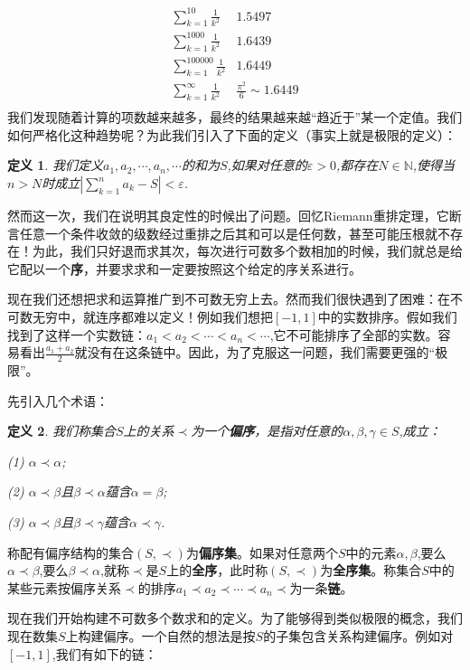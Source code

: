 \documentclass{article}
\newtheorem{definition}{定义}[subsection]
\begin{document}
$$
\begin{matrix}
	\sum_{k=1}^{10}{\frac{1}{k^2}}&		1.5497\\
	\sum_{k=1}^{1000}{\frac{1}{k^2}}&		1.6439\\
	\sum_{k=1}^{100000}{\frac{1}{k^2}}&		1.6449\\
	\sum_{k=1}^{\infty}{\frac{1}{k^2}}&		\frac{\pi ^2}{6}\sim 1.6449\\
\end{matrix}
$$
我们发现随着计算的项数越来越多，最终的结果越来越“趋近于”某一个定值。我们如何严格化这种趋势呢？为此我们引入了下面的定义（事实上就是极限的定义）：
\begin{definition}
我们定义$a_1,a_2,\cdots,a_n,\cdots$的和为$S$,如果对任意的$\varepsilon>0$,都存在$N\in\mathbb{N}$,使得当$n>N$时成立$\left|\sum_{k=1}^na_k-S\right|<\varepsilon$.
\end{definition}
然而这一次，我们在说明其良定性的时候出了问题。回忆Riemann重排定理，它断言任意一个条件收敛的级数经过重排之后其和可以是任何数，甚至可能压根就不存在！为此，我们只好退而求其次，每次进行可数多个数相加的时候，我们就总是给它配以一个\textbf{序}，并要求求和一定要按照这个给定的序关系进行。\par
现在我们还想把求和运算推广到不可数无穷上去。然而我们很快遇到了困难：在不可数无穷中，就连序都难以定义！例如我们想把$[-1,1]$中的实数排序。假如我们找到了这样一个实数链：$a_1<a_2<\cdots<a_n<\cdots$,它不可能排序了全部的实数。容易看出$\frac{a_1+a_2}{2}$就没有在这条链中。因此，为了克服这一问题，我们需要更强的“极限”。\par
先引入几个术语：
\begin{definition}
我们称集合$S$上的关系$\prec$为一个\textbf{偏序}，是指对任意的$\alpha,\beta,\gamma\in S$,成立：\par
(1) $\alpha\prec\alpha$;\par
(2) $\alpha\prec\beta$且$\beta\prec\alpha$蕴含$\alpha=\beta$;\par
(3) $\alpha\prec\beta$且$\beta\prec\gamma$蕴含$\alpha\prec\gamma$.
\end{definition}
称配有偏序结构的集合$(S,\prec)$为\textbf{偏序集}。如果对任意两个$S$中的元素$\alpha,\beta$,要么$\alpha\prec\beta$,要么$\beta\prec\alpha$,就称$\prec$是$S$上的\textbf{全序}，此时称$(S,\prec)$为\textbf{全序集}。称集合$S$中的某些元素按偏序关系$\prec$的排序$a_1\prec a_2\prec\cdots\prec a_n\prec$为一条\textbf{链}。\par
现在我们开始构建不可数多个数求和的定义。为了能够得到类似极限的概念，我们现在数集$S$上构建偏序。一个自然的想法是按$S$的子集包含关系构建偏序。例如对$[-1,1]$,我们有如下的链：
\end{document}
